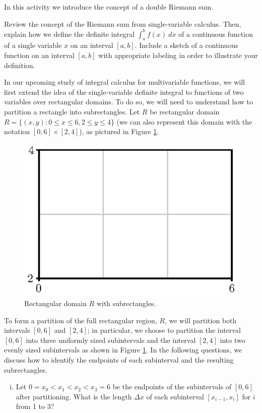 \begin{pa} \label{PA:11.1} In this activity we introduce the concept of a double Riemann sum. 
    \ba
    \item  Review the concept of the Riemann sum from single-variable calculus. Then, explain how we define the definite integral $\int_a^b f(x) \ dx$ of a continuous function of a single variable $x$ on an interval $[a,b]$. Include a sketch of a continuous function on an interval $[a,b]$ with appropriate labeling in order to illustrate your definition.


    \item In our upcoming study of integral calculus for multivariable functions, we will first extend the idea of the single-variable definite integral to functions of two variables over rectangular domains. To do so, we will need to understand how to partition a rectangle into subrectangles. Let $R$ be rectangular domain $R = \{(x,y) : 0 \leq x \leq 6, 2 \leq y \leq 4\}$ (we can also represent this domain with the notation $[0,6] \times [2,4]$), as pictured in Figure \ref{F:11.1.Domain}. 
    
        \begin{figure}[ht]
\begin{center}
  \includegraphics{figures/fig_11_1_rect_domain.eps}
\end{center}
\caption{Rectangular domain $R$ with subrectangles.}
\label{F:11.1.Domain}
\end{figure}
    
To form a partition of the full rectangular region, $R$, we will partition both intervals $[0,6]$ and $[2,4]$; in particular, we choose to partition the interval $[0,6]$ into three uniformly sized subintervals and the interval $[2,4]$ into two evenly sized subintervals as shown in Figure \ref{F:11.1.Domain}. In the following questions, we discuss how to identify the endpoints of each subinterval and the resulting subrectangles.
            \begin{enumerate}[i.]
            \item Let $0=x_0 < x_1 < x_2 < x_3=6$ be the endpoints of the subintervals of $[0,6]$ after partitioning. What is the length $\Delta x$ of each subinterval $[x_{i-1},x_i]$ for $i$ from 1 to 3?
	


\end{enumerate}
\end{pa}
